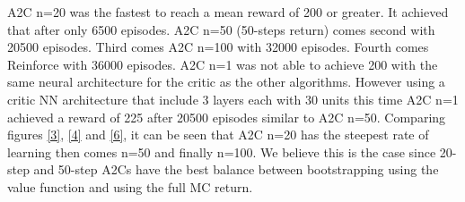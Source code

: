 \documentclass[12pt]{article}
\begin{document}
\begin{enumerate}
		A2C n=20 was the fastest to reach a mean reward of 200 or greater. It achieved that after only 6500 episodes.
		A2C n=50 (50-steps return) comes second with 20500 episodes.  
		Third comes A2C n=100 with 32000 episodes. 
		Fourth comes Reinforce with 36000 episodes. 
		A2C n=1 was not able to achieve 200 with the same neural architecture for the critic as the other algorithms. However using a critic NN architecture that include 3 layers each with 30 units this time A2C n=1 achieved a reward of 225 after 20500 episodes similar to A2C n=50.
		Comparing figures \ref{3}, \ref{4} and \ref{6},
		it can be seen that A2C n=20 has the steepest rate of learning then comes n=50 and finally n=100. 
		We believe this is the case since 20-step and 50-step A2Cs have the best balance between bootstrapping using the value function and using the full MC return.
		
		
		
		
	\end{enumerate}
	
	
	
	
\end{document}
